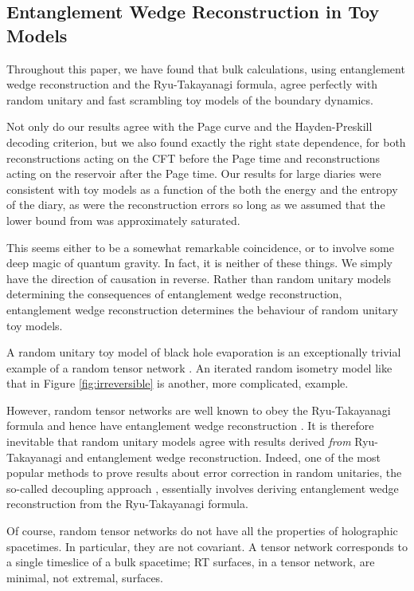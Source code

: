 \documentclass[12pt]{article}
\begin{document}
\subsection{Entanglement Wedge Reconstruction in Toy Models}
Throughout this paper, we have found that bulk calculations, using entanglement wedge reconstruction and the Ryu-Takayanagi formula, agree perfectly with random unitary and fast scrambling toy models of the boundary dynamics. 

Not only do our results agree with the Page curve and the Hayden-Preskill decoding criterion, but we also found exactly the right state dependence, for both reconstructions acting on the CFT before the Page time and reconstructions acting on the reservoir after the Page time. Our results for large diaries were consistent with toy models as a function of the both the energy and the entropy of the diary, as were the reconstruction errors so long as we assumed that the lower bound from \cite{hayden2018learning} was approximately saturated.

This seems either to be a somewhat remarkable coincidence, or to involve some deep magic of quantum gravity. In fact, it is neither of these things. We simply have the direction of causation in reverse. Rather than random unitary models determining the consequences of entanglement wedge reconstruction, entanglement wedge reconstruction determines the behaviour of random unitary toy models.

A random unitary toy model of black hole evaporation is an exceptionally trivial example of a random tensor network \cite{hayden2016holographic}. An iterated random isometry model like that in Figure \ref{fig:irreversible} is another, more complicated, example.

However, random tensor networks are well known to obey the Ryu-Takayanagi formula and hence have entanglement wedge reconstruction \cite{hayden2016holographic}. It is therefore inevitable that random unitary models agree with results derived \emph{from} Ryu-Takayanagi and entanglement wedge reconstruction. Indeed, one of the most popular methods to prove results about error correction in random unitaries, the so-called decoupling approach \cite{hayden2008decoupling, dupuis2010decoupling}, essentially involves deriving entanglement wedge reconstruction from the Ryu-Takayanagi formula.

Of course, random tensor networks do not have all the properties of holographic spacetimes. In particular, they are not covariant. A tensor network corresponds to a single timeslice of a bulk spacetime; RT surfaces, in a tensor network, are minimal, not extremal, surfaces. 
\end{document}
